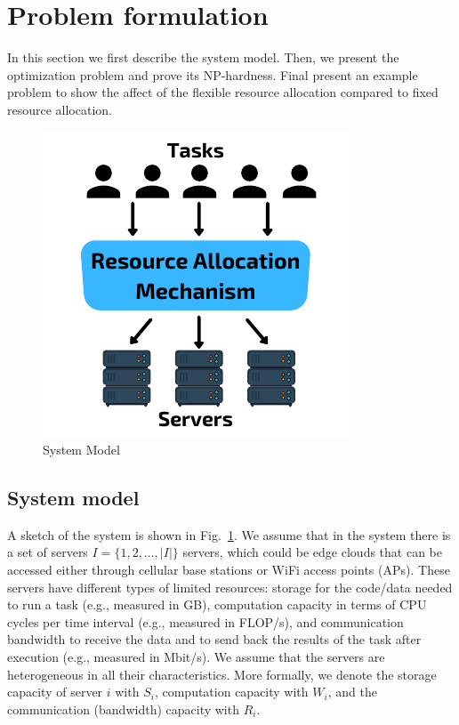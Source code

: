 \section{Problem formulation}\label{sec:problem-formulation}
In this section we first describe the system model. Then, we present the optimization problem and prove its NP-hardness.
Final present an example problem to show the affect of the flexible resource allocation compared to fixed resource
allocation.

\begin{figure}[ht]
    \centering
    \includegraphics[width=0.6\linewidth]{figs/system_model.pdf}
    \caption{System Model}
    \label{fig:system_model}
\end{figure}

\subsection{System model}\label{subsec:system-model}
A sketch of the system is shown in Fig.~\ref{fig:system_model}.
We assume that in the system there is a set of servers $I = \{1,2,\ldots,\left|I\right|\}$ servers, which could be edge
clouds that can be accessed either through cellular base stations or WiFi access points (APs). These servers have
different types of limited resources: storage for the code/data needed to run a task (e.g., measured in GB),
computation capacity in terms of CPU cycles per time interval (e.g., measured in FLOP/s), and communication bandwidth
to receive the data and to send back the results of the task after execution (e.g., measured in Mbit/s). We assume
that the servers are heterogeneous in all their characteristics. More formally, we denote the storage capacity of
server $i$ with $S_i$, computation capacity with $W_i$, and the communication (bandwidth) capacity with $R_i$.


